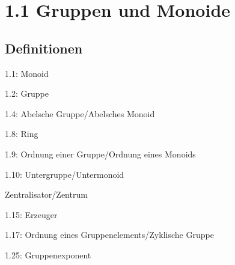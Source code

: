 \documentclass[twocolumn]{report}
\begin{document}
\section*{1.1 Gruppen und Monoide}
\subsection*{Definitionen}
\begin{enumerate*}[itemsep=0pt, topsep=0pt, parsep=0pt, partopsep=0pt, leftmargin=*]
    \item[1.1:] Monoid
    \item[1.2:] Gruppe
    \item[1.4:] Abelsche Gruppe/Abelsches Monoid
    \item[1.8:] Ring
    \item[1.9:] Ordnung einer Gruppe/Ordnung eines Monoids
    \item[1.10:] Untergruppe/Untermonoid
    \item Zentralisator/Zentrum
    \item[1.15:] Erzeuger
    \item[1.17:] Ordnung eines Gruppenelements/Zyklische Gruppe
    \item[1.25:] Gruppenexponent
\end{enumerate*}
\end{document}
